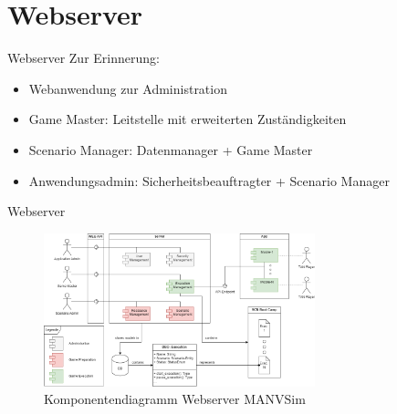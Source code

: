 %
%
\section{Webserver}

\begin{frame}{Webserver}
	Zur Erinnerung:
	\begin{itemize}
		\item Webanwendung zur Administration
		\item Game Master: Leitstelle mit erweiterten Zuständigkeiten
		\item Scenario Manager: Datenmanager + Game Master
		\item Anwendungsadmin: Sicherheitsbeauftragter + Scenario Manager
	\end{itemize}
\end{frame}

\begin{frame}{Webserver}
	\begin{figure}
		\begin{center}
			\includegraphics[width=0.7\textwidth]{images/server/component_diagram.png}
		\end{center}
		\caption{Komponentendiagramm Webserver MANVSim}\label{fig:autounfall}
	\end{figure}
\end{frame}
